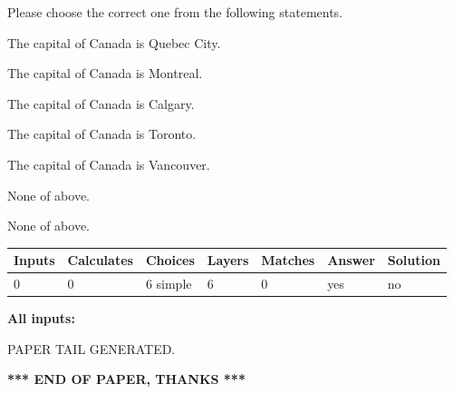 \documentclass[12pt]{article}
\begin{document}
  
Please choose the correct one from the following statements.
 
 
The capital of Canada is Quebec City.
 
 
The capital of Canada is Montreal.
 
 
The capital of Canada is Calgary.
 
 
The capital of Canada is Toronto.
 
 
The capital of Canada is Vancouver.
 
 
 None of above.
 
 
\noindent{}
 
 
 None of above.
 
 
\noindent{}
 
 
   
   
   
   
\noindent\begin{tabular}{|l|l|l|l|l|l|l|}
 \hline
Inputs & Calculates & Choices & Layers & Matches & Answer & Solution \\ \hline
 0  & 
 0  & 
 6
  simple  
  & 
 6  & 
 0  & 
  yes & 
  no 
  \\ \hline
 \end{tabular}
   
   
   
   
\noindent{}
   
   
   
   
\noindent\vspace{0.1in}\hspace{-0.08in} {\textbf{\Large{All inputs: }}}
   
   
   
   
   
   
 \vspace{0.2in}
 
   
   
\vspace{2.0in} PAPER TAIL GENERATED.
   
   
   
   
\vspace{1.0in} 
{\textbf{\large{ *** END OF PAPER, THANKS *** }}} 
   
\end{document}
